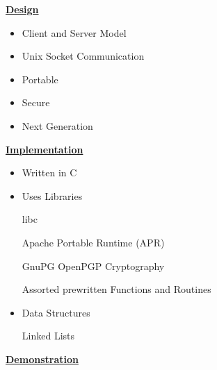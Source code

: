 \documentclass[a4,12pt]{seminar}
\newcommand{\SlideTitle}[1]{\Large \underline{\textbf{#1}}\normalsize}
\begin{document}
\begin{slide}{\SlideTitle{Design}}

\vspace{15mm}

\begin{itemize}

\item Client and Server Model

\item Unix Socket Communication

\item Portable

\item Secure

\item Next Generation 

\end{itemize}

\end{slide}


\begin{slide}{\SlideTitle{Implementation}}

\begin{itemize}

\item Written in C

\item Uses Libraries

\subitem libc

\subitem Apache Portable Runtime (APR)

\subitem GnuPG OpenPGP Cryptography

\subitem Assorted prewritten Functions and Routines

\item Data Structures

\subitem Linked Lists

\end{itemize}

\end{slide}


\begin{slide}{\SlideTitle{Demonstration}}

\vspace{25mm}

\begin{center}
\end{center}

\vspace{25mm}

\end{slide}
\end{document}

